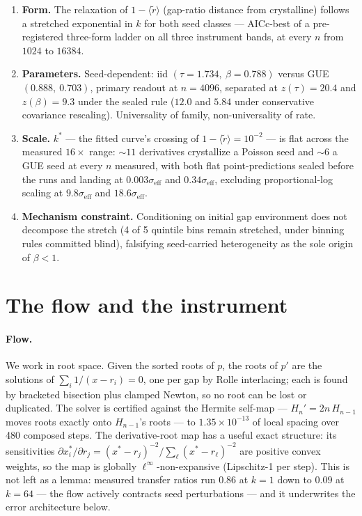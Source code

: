 \documentclass[11pt]{article}
\newcommand{\rt}{\widetilde{r}}
\newcommand{\gapdist}{1-\langle\rt\rangle}
\newcommand{\kstar}{k^{*}}
\newcommand{\seff}{\sigma_{\mathrm{eff}}}
\begin{document}
\begin{enumerate}
\item \textbf{Form.} The relaxation of $\gapdist$ (gap-ratio distance from crystalline) follows
a stretched exponential in $k$ for both seed classes --- AICc-best of a pre-registered
three-form ladder on all three instrument bands, at every $n$ from $1024$ to $16384$.
\item \textbf{Parameters.} Seed-dependent: iid $(\tau=1.734,\ \beta=0.788)$ versus GUE
$(0.888,\ 0.703)$, primary readout at $n=4096$, separated at $z(\tau)=20.4$ and $z(\beta)=9.3$
under the sealed rule ($12.0$ and $5.84$ under conservative covariance rescaling). Universality
of family, non-universality of rate.
\item \textbf{Scale.} $\kstar$ --- the fitted curve's crossing of $\gapdist=10^{-2}$ --- is flat
across the measured $16\times$ range: ${\sim}11$ derivatives crystallize a Poisson seed and
${\sim}6$ a GUE seed at every $n$ measured, with both flat point-predictions sealed before the
runs and landing at $0.003\seff$ and $0.34\seff$, excluding proportional-log scaling at
$9.8\seff$ and $18.6\seff$.
\item \textbf{Mechanism constraint.} Conditioning on initial gap environment does not decompose
the stretch (4 of 5 quintile bins remain stretched, under binning rules committed blind),
falsifying seed-carried heterogeneity as the sole origin of $\beta<1$.
\end{enumerate}

\section{The flow and the instrument}

\paragraph{Flow.} We work in root space. Given the sorted roots of $p$, the roots of $p'$ are
the solutions of $\sum_i 1/(x-r_i)=0$, one per gap by Rolle interlacing; each is found by
bracketed bisection plus clamped Newton, so no root can be lost or duplicated. The solver is
certified against the Hermite self-map --- $H_n'=2n\,H_{n-1}$ moves roots exactly onto
$H_{n-1}$'s roots --- to $1.35\times10^{-13}$ of local spacing over 480 composed steps. The
derivative-root map has a useful exact structure: its sensitivities
$\partial x^{*}_i/\partial r_j=(x^{*}-r_j)^{-2}/\sum_\ell (x^{*}-r_\ell)^{-2}$ are positive
convex weights, so the map is globally $\ell^\infty$-non-expansive (Lipschitz-1 per step). This
is not left as a lemma: measured transfer ratios run $0.86$ at $k=1$ down to $0.09$ at $k=64$
--- the flow actively contracts seed perturbations --- and it underwrites the error architecture
below.
\end{document}
